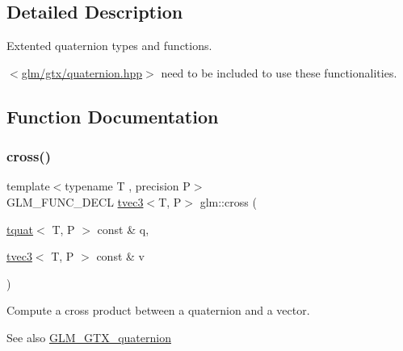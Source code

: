 \subsection{Detailed Description}
Extented quaternion types and functions. 

$<$\hyperlink{gtx_2quaternion_8hpp}{glm/gtx/quaternion.\+hpp}$>$ need to be included to use these functionalities. 

\subsection{Function Documentation}
\mbox{\label{group__gtx__quaternion_ga33ecf8ba903eee5fc09f0fbfc0d5ca6b}} 
\subsubsection{\texorpdfstring{cross()}{cross()}\hspace{0.1cm}{\footnotesize\ttfamily [1/2]}}
{\footnotesize\ttfamily template$<$typename T , precision P$>$ \\
G\+L\+M\+\_\+\+F\+U\+N\+C\+\_\+\+D\+E\+CL \hyperlink{structglm_1_1tvec3}{tvec3}$<$T, P$>$ glm\+::cross (\begin{DoxyParamCaption}\item[{\hyperlink{structglm_1_1tquat}{tquat}$<$ T, P $>$ const \&}]{q,  }\item[{\hyperlink{structglm_1_1tvec3}{tvec3}$<$ T, P $>$ const \&}]{v }\end{DoxyParamCaption})}

Compute a cross product between a quaternion and a vector.

\begin{DoxySeeAlso}{See also}
\hyperlink{group__gtx__quaternion}{G\+L\+M\+\_\+\+G\+T\+X\+\_\+quaternion} 
\end{DoxySeeAlso}
\mbox{\label{group__gtx__quaternion_ga4bfe3c7770fc43d14b8ef0058c4a86b5}} 
